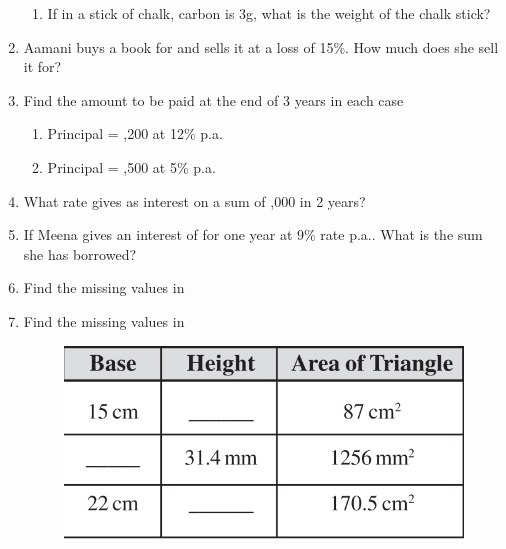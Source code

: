 \begin{enumerate}[label=\thesubsection.\arabic*,ref=\thesubsection.\theenumi,resume*]
\begin{enumerate}
		\item  If in a stick of chalk, carbon is 3g, what is the weight of the chalk stick?
	\end{enumerate}
\item Aamani buys a book for  and sells it at a loss of 15\%. How much does she sell it for?
\item  Find the amount to be paid at the end of 3 years in each case
	\begin{enumerate}
\item  Principal = ,200 at 12\% p.a.
\item  Principal = ,500 at 5\% p.a.
	\end{enumerate}
\item  What rate gives  as interest on a sum of ,000 in 2 years? 
\item  If Meena gives an interest of  for one year at 9\% rate p.a.. What is the sum she has borrowed?
\item	Find the missing values
	in
	\begin{table}[H]
  \centering
  
  \caption{}
  \label{tab:pgm}
\end{table}
\item	Find the missing values
	in
	\begin{figure}[H]
  \centering
  \includegraphics[width=\columnwidth]{figs/area1.jpg}
  \caption{}
  \label{fig:area1}
\end{figure}
\end{enumerate}
